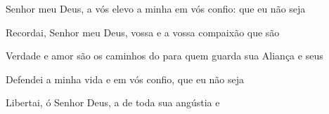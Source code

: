 \begin{multicols}{2}
  \begin{greenumerate}
    \item {}Senhor meu Deus, a vós elevo a minha  em vós confio: que eu não seja 

    \item {}Recordai, Senhor meu Deus, vossa  e a vossa compaixão que são 

    \item {}Verdade e amor são os caminhos do  para quem guarda sua Aliança e seus 

    \item {}Defendei a minha vida e  em vós confio, que eu não seja 

    \item {}Libertai, ó Senhor Deus, a  de toda sua angústia e 
  \end{greenumerate}
\end{multicols}